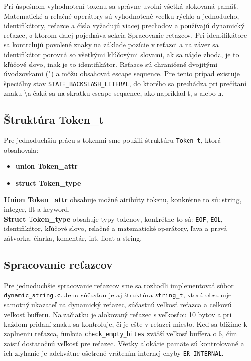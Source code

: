 \documentclass [11pt, a4paper]{article}
\begin{document}
Pri úspešnom vyhodnotení tokenu sa správne uvoľní všetká alokovaná pamäť. Matematické a relačné operátory sú vyhodnotené vcelku rýchlo a jednoducho, identifikátory, reťazce a čísla vyžadujú viacej prechodov a používajú dynamický reťazec, o ktorom ďalej pojednáva sekcia Spracovanie reťazcov. Pri identifikátore sa kontrolujú povolené znaky na základe pozície v reťazci a na záver sa identifikátor porovná so všetkými kľúčovými slovami, ak sa nájde zhoda, je to kľúčové slovo, inak je to identifikátor. Reťazce sú ohraničené dvojitými úvodzovkami (") a môžu obsahovať escape sequence. Pre tento prípad existuje špeciálny stav \texttt{STATE\_BACKSLASH\_LITERAL}, do ktorého sa prechádza pri  prečítaní znaku \textbackslash \quad a čaká sa na skratku escape sequence, ako napríklad t, s alebo n. 

\subsection{Štruktúra Token\_t}
Pre jednoduchšiu prácu s tokenmi sme použili štruktúru \texttt{Token\_t}, ktorá obsahovala:

\begin{itemize}
\item \textbf{union Token\_attr}
\item \textbf{struct Token\_type}
\end{itemize}
\textbf{Union Token\_attr} obsahuje možné atribúty tokenu, konkrétne to sú: string, integer, flt a keyword. \\
\textbf{Struct Token\_type} obsahuje typy tokenov, konkrétne to sú: \texttt{EOF}, \texttt{EOL}, identifikátor, kľúčové slovo, relačné a matematické operátory, ľava a pravá zátvorka, čiarka, komentár, int, float a string.


\subsection{Spracovanie reťazcov}
Pre jednoduchšie spracovanie reťazcov sme sa rozhodli implementovať súbor \texttt{dynamic\_string.c}. Jeho súčasťou je aj štruktúra \texttt{string\_t}, ktorá obsahuje samotný ukazateľ na dynamický reťazec, súčastnú veľkosť reťazca a celkovú veľkosť bufferu. Na začiatku je alokovaný reťazec s veľkosťou 10 bytov a pri každom pridaní znaku sa kontroluje, či je ešte v reťazci miesto. Keď sa blížime k zaplneniu reťazca, funkcia \texttt{check\_empty\_bites} zväčší veľkosť buffera o 5, čím zaistí dostatočnú veľkosť pre reťazec. Všetky alokácie pamäte sú kontrolované a ich zlyhanie je adekvátne ošetrené vrátením internej chyby \texttt{ER\_INTERNAL}.
\end{document}
